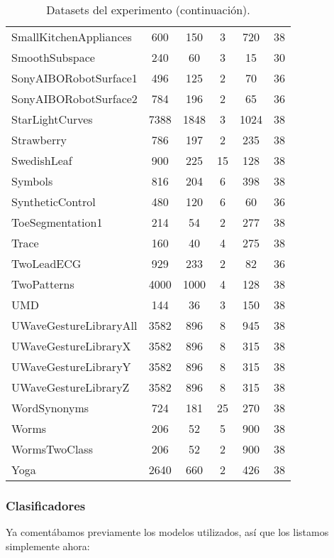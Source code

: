 \begin{table}[htbp]
\begin{tabular}{||l c c c c c||}
 SmallKitchenAppliances & 600 & 150 & 3 & 720 & 38 \\
 SmoothSubspace & 240 & 60 & 3 & 15 & 30 \\
 SonyAIBORobotSurface1 & 496 & 125 & 2 & 70 & 36 \\
 SonyAIBORobotSurface2 & 784 & 196 & 2 & 65 & 36 \\
 StarLightCurves & 7388 & 1848 & 3 & 1024 & 38 \\
 Strawberry & 786 & 197 & 2 & 235 & 38 \\
 SwedishLeaf & 900 & 225 & 15 & 128 & 38 \\
 Symbols & 816 & 204 & 6 & 398 & 38 \\
 SyntheticControl & 480 & 120 & 6 & 60 & 36 \\
 ToeSegmentation1 & 214 & 54 & 2 & 277 & 38 \\
 Trace & 160 & 40 & 4 & 275 & 38 \\
 TwoLeadECG & 929 & 233 & 2 & 82 & 36 \\
 TwoPatterns & 4000 & 1000 & 4 & 128 & 38 \\
 UMD & 144 & 36 & 3 & 150 & 38 \\
 UWaveGestureLibraryAll & 3582 & 896 & 8 & 945 & 38 \\
 UWaveGestureLibraryX & 3582 & 896 & 8 & 315 & 38 \\
 UWaveGestureLibraryY & 3582 & 896 & 8 & 315 & 38 \\
 UWaveGestureLibraryZ & 3582 & 896 & 8 & 315 & 38 \\
 WordSynonyms & 724 & 181 & 25 & 270 & 38 \\
 Worms & 206 & 52 & 5 & 900 & 38 \\
 WormsTwoClass & 206 & 52 & 2 & 900 & 38 \\
 Yoga & 2640 & 660 & 2 & 426 & 38 \\ [1ex]
 \hline
\end{tabular}
\caption{Datasets del experimento (continuación).}
\label{table:pv-datasets2}
\end{table}

\subsubsection{Clasificadores}

Ya comentábamos previamente los modelos utilizados, así que los listamos simplemente ahora:

